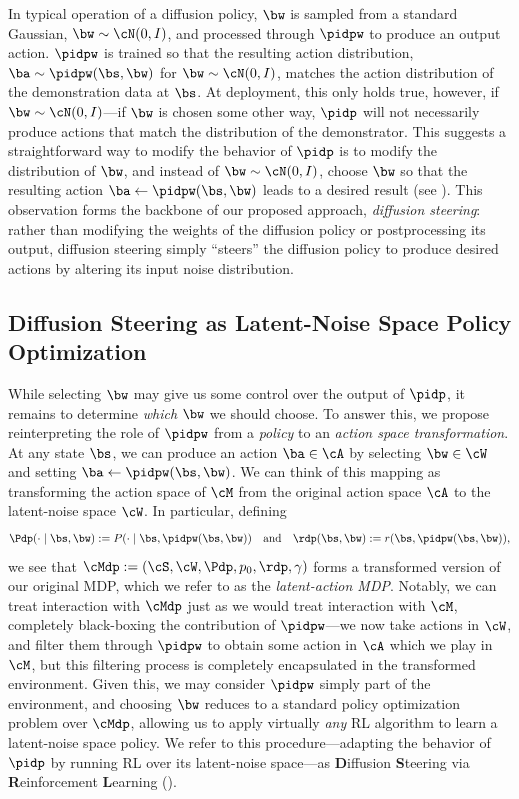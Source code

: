 In typical operation of a diffusion policy, $\bw$ is sampled from a standard Gaussian, $\bw \sim \cN(0,I)$, and processed through $\pidpw$ to produce an output action. $\pidpw$ is trained so that the resulting action distribution, $\ba \sim \pidpw(\bs,\bw)$ for $\bw \sim \cN(0,I)$, matches the action distribution of the demonstration data at $\bs$. At deployment, this only holds true, however, if $\bw \sim \cN(0,I)$---if $\bw$ is chosen some other way, $\pidp$ will not necessarily produce actions that match the distribution of the demonstrator.
This suggests a straightforward way to modify the behavior of $\pidp$ is to  modify the distribution of $\bw$, and instead of $\bw \sim \cN(0,I)$, choose $\bw$ so that the resulting action $\ba \leftarrow \pidpw(\bs,\bw)$ leads to a desired result (see ). 
This observation forms the backbone of our proposed approach, \emph{diffusion steering}: rather than modifying the weights of the diffusion policy or postprocessing its output, diffusion steering simply ``steers'' the diffusion policy to produce desired actions by altering its input noise distribution.\loose


\iftoggle{arxiv2}{}{\vspace{-0.5em}}
\subsection{Diffusion Steering as Latent-Noise Space Policy Optimization}
\iftoggle{arxiv2}{}{\vspace{-0.5em}}
While selecting $\bw$ may give us some control over the output of $\pidp$, it remains to determine \emph{which} $\bw$ we should choose. To answer this, we propose reinterpreting the role of $\pidpw$ from a \emph{policy} to an \emph{action space transformation}.
At any state $\bs$, we can produce an action $\ba \in \cA$ by selecting $\bw \in \cW$ and setting $\ba \leftarrow \pidpw(\bs,\bw)$. 
We can think of this mapping as transforming the action space of $\cM$ from the original action space $\cA$ to the latent-noise space $\cW$. In particular, defining
\begin{align*}
\Pdp(\cdot \mid \bs,\bw) := P(\cdot \mid \bs, \pidpw(\bs,\bw)) \quad \text{and} \quad \rdp(\bs,\bw) := r(\bs, \pidpw(\bs,\bw)),
\end{align*}
we see that $\cMdp := (\cS, \cW, \Pdp, p_0, \rdp, \gamma)$ forms a transformed version of our original MDP, which we refer to as the \emph{latent-action MDP}. 
Notably, we can treat interaction with $\cMdp$ just as we would treat interaction with $\cM$, completely black-boxing the contribution of $\pidpw$---we now take actions in $\cW$, and filter them through $\pidpw$ to obtain some action in $\cA$ which we play in $\cM$, but this filtering process is completely encapsulated in the transformed environment. Given this, we may consider $\pidpw$ simply part of the environment, and choosing $\bw$ reduces to a standard policy optimization problem over $\cMdp$, allowing us to apply virtually \emph{any} RL algorithm to learn a latent-noise space policy. 
We refer to this procedure---adapting the behavior of $\pidp$ by running RL over its latent-noise space---as \textbf{D}iffusion \textbf{S}teering via \textbf{R}einforcement \textbf{L}earning (\algname). 

